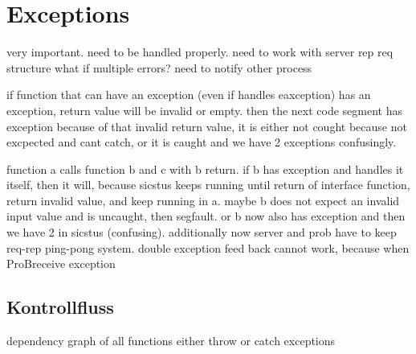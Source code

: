 



\section{Exceptions}

very important.
need to be handled properly.
need to work with server rep req structure
what if multiple errors?
need to notify other process

if function that can have an exception (even if handles eaxception) has an exception, return value will be invalid or empty.
then the next code segment has exception because of that invalid return value, it is either not cought because not excpected and cant catch, or it is caught and we have 2 exceptions confusingly.

function a calls function b and c with b return.
if b has exception and handles it itself, then it will, because sicstus keeps running until return of interface function, return invalid value, and keep running in a.
maybe b does not expect an invalid input value and is uncaught, then segfault. or b now also has exception and then we have 2 in sicstus (confusing).
additionally now server and prob have to keep req-rep ping-pong system. double exception feed back cannot work, because when ProBreceive exception



\subsection{Kontrollfluss}

dependency graph of all functions
either throw or catch exceptions



